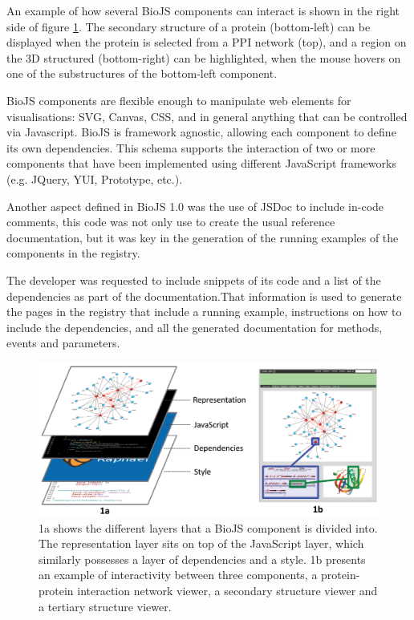 An example of how several BioJS components can interact is shown in the right side of figure \ref{fig:biojs_layers}. The secondary structure of a protein (bottom-left) can be displayed when the protein is selected from a PPI network (top), and a region on the 3D structured (bottom-right) can be highlighted, when the mouse hovers on one of the substructures of the bottom-left component.

BioJS components are flexible enough to manipulate web elements for visualisations: SVG, Canvas, CSS, and in general anything that can be controlled via Javascript. BioJS is framework agnostic, allowing each component to define its own dependencies. This schema supports the interaction of two or more components that have been implemented using different JavaScript frameworks (e.g. JQuery, YUI, Prototype, etc.).
 
Another aspect defined in BioJS 1.0 was the use of JSDoc to include in-code comments, this code was not only use to create the usual reference documentation, but it was key in the generation of the running examples of the components in the registry. 

The developer was requested to include snippets of its code and a list of the dependencies as part of the documentation.That information is used to generate the pages in the registry that include a running example, instructions on how to include the dependencies, and all the generated documentation for methods, events and parameters.

\begin{figure}  
\centering
\includegraphics[width=\textwidth]{figures/biojs_layers.png}
\caption[BioJS layers.]{1a shows the different layers that a BioJS component is divided into. The representation layer sits on top of the JavaScript layer, which similarly possesses a layer of dependencies and a style. 1b presents an example of interactivity between three components, a protein-protein interaction network viewer, a secondary structure viewer and a tertiary structure viewer. 
\label{fig:biojs_layers}}
\end{figure}
 
